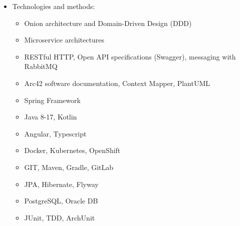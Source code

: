 \documentclass[11pt,a4paper,sans]{moderncv}        %
\begin{document}
{\begin{itemize}%
\item Technologies and methods:
	\begin{itemize}
		\item Onion architecture and Domain-Driven Design (DDD)
		\item Microservice architectures
		\item RESTful HTTP, Open API specifications (Swagger), messaging with RabbitMQ
		\item Arc42 software documentation, Context Mapper, PlantUML
		\item Spring Framework
		\item Java 8-17, Kotlin
		\item Angular, Typescript
		\item Docker, Kubernetes, OpenShift
		\item GIT, Maven, Gradle, GitLab
		\item JPA, Hibernate, Flyway
		\item PostgreSQL, Oracle DB
		\item JUnit, TDD, ArchUnit
	\end{itemize}
\end{itemize}}
\end{document}
